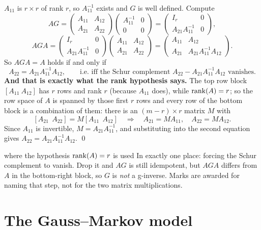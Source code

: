 \documentclass[11pt]{article}
\begin{document}
\prf $A_{11}$ is $r\times r$ of rank $r$, so $A_{11}^{-1}$ exists and $G$ is well defined.
Compute
\[
  AG=\begin{pmatrix}A_{11}&A_{12}\\A_{21}&A_{22}\end{pmatrix}
     \begin{pmatrix}A_{11}^{-1}&0\\0&0\end{pmatrix}
    =\begin{pmatrix}I_r&0\\A_{21}A_{11}^{-1}&0\end{pmatrix},
\]
\[
  AGA=\begin{pmatrix}I_r&0\\A_{21}A_{11}^{-1}&0\end{pmatrix}
      \begin{pmatrix}A_{11}&A_{12}\\A_{21}&A_{22}\end{pmatrix}
     =\begin{pmatrix}A_{11}&A_{12}\\A_{21}&A_{21}A_{11}^{-1}A_{12}\end{pmatrix}.
\]
So $AGA=A$ holds if and only if
\[
  A_{22}=A_{21}A_{11}^{-1}A_{12},
  \qquad\text{i.e.\ iff the Schur complement } A_{22}-A_{21}A_{11}^{-1}A_{12} \text{ vanishes.}
\]
\textbf{And that is exactly what the rank hypothesis says.} The top row block
$[A_{11}\ A_{12}]$ has $r$ rows and rank $r$ (because $A_{11}$ does), while $\operatorname{rank}(A)=r$; so
the row space of $A$ is spanned by those first $r$ rows and every row of the bottom block is
a combination of them: there is an $(m-r)\times r$ matrix $M$ with
\[
  [A_{21}\ \ A_{22}]=M[A_{11}\ \ A_{12}]
  \quad\Longrightarrow\quad A_{21}=MA_{11},\quad A_{22}=MA_{12}.
\]
Since $A_{11}$ is invertible, $M=A_{21}A_{11}^{-1}$, and substituting into the second
equation gives $A_{22}=A_{21}A_{11}^{-1}A_{12}$. \qed

\begin{confusion}{where the hypothesis $\operatorname{rank}(A)=r$ is used}
In exactly one place: forcing the Schur complement to vanish. Drop it and $AG$ is still
idempotent, but $AGA$ differs from $A$ in the bottom-right block, so $G$ is \emph{not} a
g-inverse. Marks are awarded for naming that step, not for the two matrix multiplications.
\end{confusion}

\section{The Gauss--Markov model}
\end{document}
